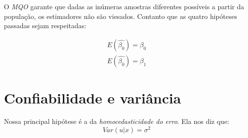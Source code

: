 \documentclass[12pt,a4paper,oneside,brazil]{abntex2}
\begin{document}
O \emph{MQO} garante que dadas as inúmeras amostras diferentes possíveis a partir da população, os estimadores não são viesados. Contanto que as quatro hipóteses passadas sejam respeitadas:

\begin{align}
    E(\hat{\beta_0}) = \beta_0 \\
    E(\hat{\beta_0}) = \beta_1
\end{align} 

\section{Confiabilidade e variância}

Nossa principal hipótese é a da \emph{homocedasticidade do erro}.
Ela nos diz que:
\begin{equation}
  \label{homocedasticidade}
Var(u|x) = \sigma^2
\end{equation}



\printbibliography
\end{document}
